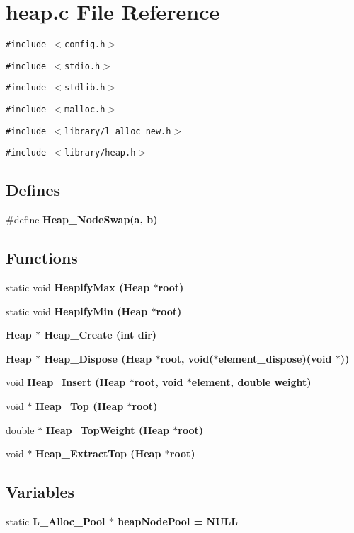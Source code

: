 \section{heap.c File Reference}
\label{heap_8c}
{\tt \#include $<$config.h$>$}\par
{\tt \#include $<$stdio.h$>$}\par
{\tt \#include $<$stdlib.h$>$}\par
{\tt \#include $<$malloc.h$>$}\par
{\tt \#include $<$library/l\_\-alloc\_\-new.h$>$}\par
{\tt \#include $<$library/heap.h$>$}\par
\subsection*{Defines}
\begin{CompactItemize}
\item 
\#define \bf{Heap\_\-Node\-Swap}(a, b)
\end{CompactItemize}
\subsection*{Functions}
\begin{CompactItemize}
\item 
static void \bf{Heapify\-Max} (\bf{Heap} $\ast$root)
\item 
static void \bf{Heapify\-Min} (\bf{Heap} $\ast$root)
\item 
\bf{Heap} $\ast$ \bf{Heap\_\-Create} (int dir)
\item 
\bf{Heap} $\ast$ \bf{Heap\_\-Dispose} (\bf{Heap} $\ast$root, void($\ast$element\_\-dispose)(void $\ast$))
\item 
void \bf{Heap\_\-Insert} (\bf{Heap} $\ast$root, void $\ast$element, double weight)
\item 
void $\ast$ \bf{Heap\_\-Top} (\bf{Heap} $\ast$root)
\item 
double $\ast$ \bf{Heap\_\-Top\-Weight} (\bf{Heap} $\ast$root)
\item 
void $\ast$ \bf{Heap\_\-Extract\-Top} (\bf{Heap} $\ast$root)
\end{CompactItemize}
\subsection*{Variables}
\begin{CompactItemize}
\item 
static \bf{L\_\-Alloc\_\-Pool} $\ast$ \bf{heap\-Node\-Pool} = NULL
\end{CompactItemize}


